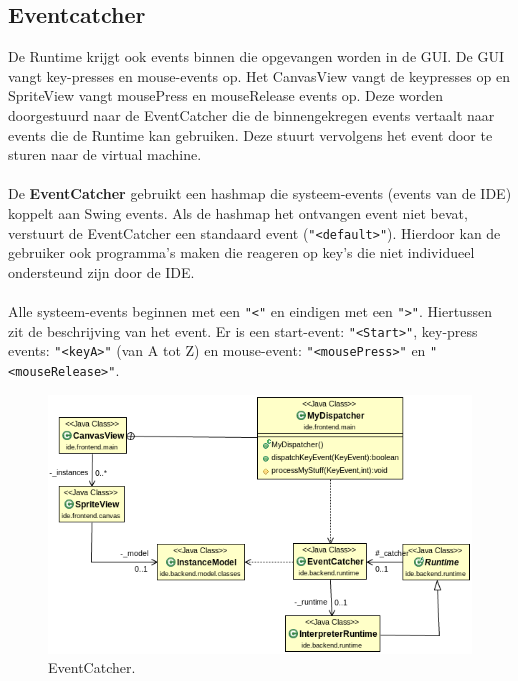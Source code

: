 \documentclass[]{article}
\begin{document}
\subsection{Eventcatcher}
De Runtime krijgt ook events binnen die opgevangen worden in de GUI. De GUI vangt key-presses en mouse-events op. Het CanvasView vangt de keypresses op en SpriteView vangt mousePress en mouseRelease events op. Deze worden doorgestuurd naar de EventCatcher die de binnengekregen events vertaalt naar events die de Runtime kan gebruiken. Deze stuurt vervolgens het event door te sturen naar de virtual machine.\\\\
De \textbf{EventCatcher} gebruikt een hashmap die systeem-events (events van de IDE) koppelt aan Swing events. Als de hashmap het ontvangen event niet bevat, verstuurt de EventCatcher een standaard event (\texttt{"<default>"}). Hierdoor kan de gebruiker ook programma's maken die reageren op key's die niet individueel ondersteund zijn door de IDE. \\\\
Alle systeem-events beginnen met een \texttt{"<"} en eindigen met een \texttt{">"}. Hiertussen zit de beschrijving van het event. Er is een start-event: \texttt{"<Start>"}, key-press events: \texttt{"<keyA>"} (van A tot Z) en mouse-event: \texttt{"<mousePress>"}  en \texttt{"<mouseRelease>"}.

\begin{figure}[H]
  \centering
\includegraphics[scale=0.4]{AnalyseADTAlgorithm/dispatcher.png}
  \caption{EventCatcher.} 
\end{figure}
\end{document}
